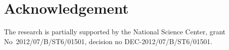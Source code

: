 \documentclass{llncs}
\begin{document}

\section*{Acknowledgement}

\noindent The research is partially supported  by the National Science Center, grant \\\mbox{No~2012/07/B/ST6/01501}, decision no \mbox{DEC-2012/07/B/ST6/01501}.

\end{document}
